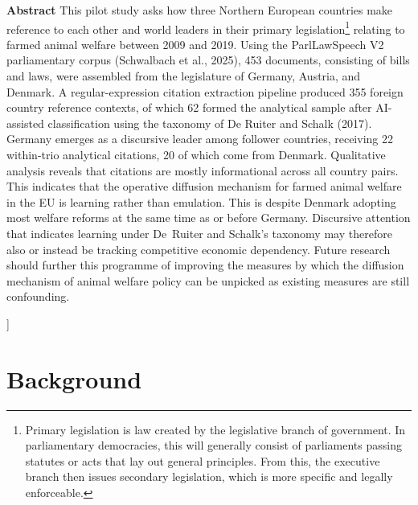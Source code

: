 \documentclass[twocolumn, 10pt, a4paper]{article}
\begin{document}
{\begin{@twocolumnfalse}
\noindent\textbf{Abstract} \quad
This pilot study asks how three Northern European countries make reference to each
other and world leaders in their primary legislation\footnote{Primary legislation is
law created by the legislative branch of government. In parliamentary democracies,
this will generally consist of parliaments passing statutes or acts that lay out
general principles. From this, the executive branch then issues secondary
legislation, which is more specific and legally enforceable.} relating to farmed
animal welfare between 2009 and 2019. Using the ParlLawSpeech V2 parliamentary
corpus (Schwalbach et al., 2025), 453 documents, consisting of bills and laws, were
assembled from the legislature of Germany, Austria, and Denmark. A
regular-expression citation extraction pipeline produced 355 foreign country
reference contexts, of which 62 formed the analytical sample after AI-assisted
classification using the taxonomy of De Ruiter and Schalk (2017). Germany emerges
as a discursive leader among follower countries, receiving 22 within-trio analytical
citations, 20 of which come from Denmark. Qualitative analysis reveals that
citations are mostly informational across all country pairs. This indicates that the
operative diffusion mechanism for farmed animal welfare in the EU is learning rather
than emulation. This is despite Denmark adopting most welfare reforms at the same
time as or before Germany. Discursive attention that indicates learning under
De~Ruiter and Schalk's taxonomy may therefore also or instead be tracking competitive
economic dependency. Future research should further this programme of improving the
measures by which the diffusion mechanism of animal welfare policy can be unpicked as
existing measures are still confounding.

\vspace{1.2em}
\end{@twocolumnfalse}
}]
\thispagestyle{firstpagestyle}  %


\section{Background}
\end{document}
